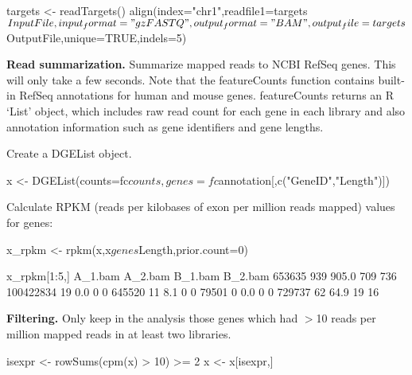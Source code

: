 \documentclass[12pt]{report}
\newcommand{\DGEList}{\textsf{DGEList}}
\newcommand{\featureCounts}{\textsf{featureCounts}}
\newcommand{\R}{\textsf{R}}
\begin{document}
\begin{Rcode}
targets <- readTargets()
align(index="chr1",readfile1=targets$InputFile,input_format="gzFASTQ",output_format="BAM",
output_file=targets$OutputFile,unique=TRUE,indels=5)
\end{Rcode}

{\noindent\bf Read summarization.} Summarize mapped reads to NCBI RefSeq genes.
This will only take a few seconds.
Note that the {\featureCounts} function contains built-in RefSeq annotations for human and mouse genes.
{\featureCounts} returns an {\R} `List' object, which includes raw read count for each gene in each library and also annotation information such as gene identifiers and gene lengths.


Create a {\DGEList} object.
\begin{Rcode}
x <- DGEList(counts=fc$counts, genes=fc$annotation[,c("GeneID","Length")])
\end{Rcode}

Calculate RPKM (reads per kilobases of exon per million reads mapped) values for genes:
\begin{Rcode}
x_rpkm <- rpkm(x,x$genes$Length,prior.count=0)

x_rpkm[1:5,]
          A_1.bam A_2.bam B_1.bam B_2.bam
653635        939   905.0     709     736
100422834      19     0.0       0       0
645520         11     8.1       0       0
79501           0     0.0       0       0
729737         62    64.9      19      16
\end{Rcode}


{\noindent\bf Filtering.} Only keep in the analysis those genes which had $>$10 reads per million mapped reads in at least two libraries.

\begin{Rcode}
isexpr <- rowSums(cpm(x) > 10) >= 2
x <- x[isexpr,]
\end{Rcode}
\end{document}
